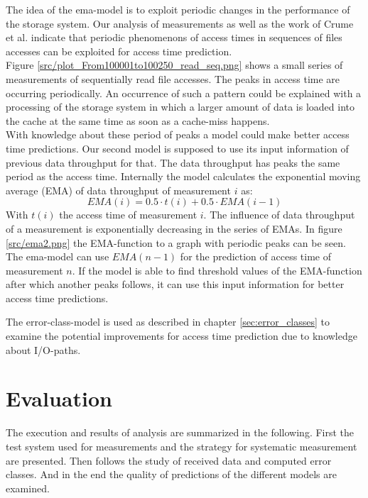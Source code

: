 \documentclass{superfri}
\begin{document}
The idea of the ema-model is to exploit periodic changes in the performance of the storage system.
Our analysis of measurements as well as the work of Crume et al. \cite{Crume:2013:FML:2538542.2538561} indicate that periodic phenomenons of access times in sequences of files accesses can be exploited for access time prediction.\\
Figure \ref{src/plot_From100001to100250_read_seq.png} shows a small series of measurements of sequentially read file accesses.
The peaks in access time are occurring periodically. An occurrence of such a pattern could be explained with a processing of the storage system in which a larger amount of data is loaded into the cache at the same time as soon as a cache-miss happens.
\\
With knowledge about these period of peaks a model could make better access time predictions.
Our second model is supposed to use its input information of previous data throughput for that.
The data throughput has peaks the same period as the access time.
Internally the model calculates the exponential moving average (EMA) of data throughput of measurement $i$ as:
\begin{equation}
EMA(i) = 0.5 \cdot t(i)+ 0.5 \cdot EMA(i-1)
\end{equation}
With $t(i)$ the access time of measurement $i$.
The influence of data throughput of a measurement is exponentially decreasing in the series of EMAs.
In figure \ref{src/ema2.png} the EMA-function to a graph with periodic peaks can be seen.
\\
The ema-model can use $EMA(n-1)$ for the prediction of access time of measurement $n$.
If the model is able to find threshold values of the EMA-function after which another peaks follows, it can use this input information for better access time predictions.\medskip

The error-class-model is used as described in chapter \ref{sec:error_classes} to examine the potential improvements for access time prediction due to knowledge about I/O-paths.

\section{Evaluation}
The execution and results of analysis are summarized in the following.
First the test system used for measurements and the strategy for systematic measurement are presented.
Then follows the study of received data and computed error classes.
And in the end the quality of predictions of the different models are examined.
\end{document}
